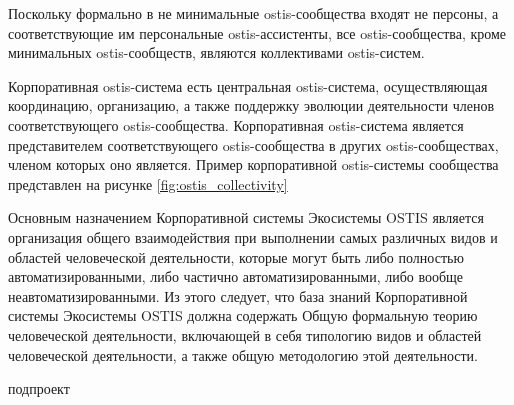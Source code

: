 
Поскольку формально в не минимальные ostis-сообщества входят не персоны, а соответствующие им персональные ostis-ассистенты, все ostis-сообщества, кроме минимальных ostis-сообществ, являются коллективами ostis-систем.

Корпоративная ostis-система есть центральная ostis-система, осуществляющая координацию, организацию, а также поддержку эволюции деятельности членов соответствующего ostis-сообщества. 
Корпоративная ostis-система является представителем соответствующего ostis-сообщества в других ostis-сообществах, членом которых оно является.
Пример корпоративной ostis-системы сообщества представлен на рисунке \ref{fig:ostis_collectivity}


Основным назначением Корпоративной системы Экосистемы OSTIS является организация общего взаимодействия при выполнении самых различных видов и областей человеческой деятельности, которые могут быть либо полностью автоматизированными, либо частично автоматизированными, либо вообще неавтоматизированными. 
Из этого следует, что база знаний Корпоративной системы Экосистемы OSTIS должна содержать Общую формальную теорию человеческой деятельности, включающей в себя типологию видов и областей человеческой деятельности, а также общую методологию этой деятельности.

\begin{SCn}
\begin{scnrelfromlist}{подпроект}
\end{scnrelfromlist}
\end{SCn}

